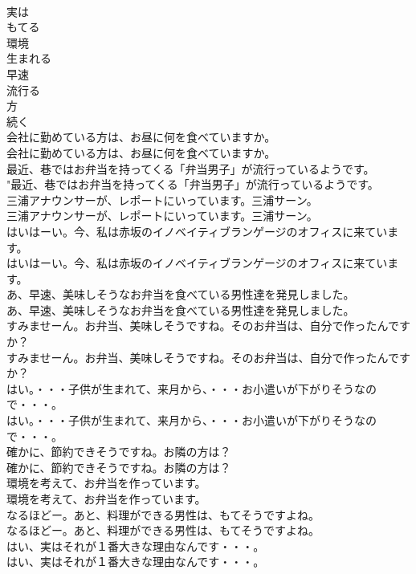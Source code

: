 \documentclass[8pt]{extreport}
\begin{document}
\begin{CJK}{UTF8}{min}
\\	実は
\\	もてる
\\	環境
\\	生まれる
\\	早速
\\	流行る
\\	方
\\	続く
\\	会社に勤めている方は、お昼に何を食べていますか。	
\\	会社に勤めている方は、お昼に何を食べていますか。 
\\	最近、巷ではお弁当を持ってくる「弁当男子」が流行っているようです。	
\\	"最近、巷ではお弁当を持ってくる「弁当男子」が流行っているようです。 
\\	三浦アナウンサーが、レポートにいっています。三浦サーン。	
\\	三浦アナウンサーが、レポートにいっています。三浦サーン。 
\\	はいはーい。今、私は赤坂のイノベイティブランゲージのオフィスに来ています。	
\\	はいはーい。今、私は赤坂のイノベイティブランゲージのオフィスに来ています。 
\\	あ、早速、美味しそうなお弁当を食べている男性達を発見しました。	
\\	あ、早速、美味しそうなお弁当を食べている男性達を発見しました。 
\\	すみませーん。お弁当、美味しそうですね。そのお弁当は、自分で作ったんですか？	
\\	すみませーん。お弁当、美味しそうですね。そのお弁当は、自分で作ったんですか？ 
\\	はい。・・・子供が生まれて、来月から、・・・お小遣いが下がりそうなので・・・。	
\\	はい。・・・子供が生まれて、来月から、・・・お小遣いが下がりそうなので・・・。 
\\	確かに、節約できそうですね。お隣の方は？	
\\	確かに、節約できそうですね。お隣の方は？ 
\\	環境を考えて、お弁当を作っています。	
\\	環境を考えて、お弁当を作っています。 
\\	なるほどー。あと、料理ができる男性は、もてそうですよね。	
\\	なるほどー。あと、料理ができる男性は、もてそうですよね。 
\\	はい、実はそれが１番大きな理由なんです・・・。	
\\	はい、実はそれが１番大きな理由なんです・・・。 

\end{CJK}
\end{document}
